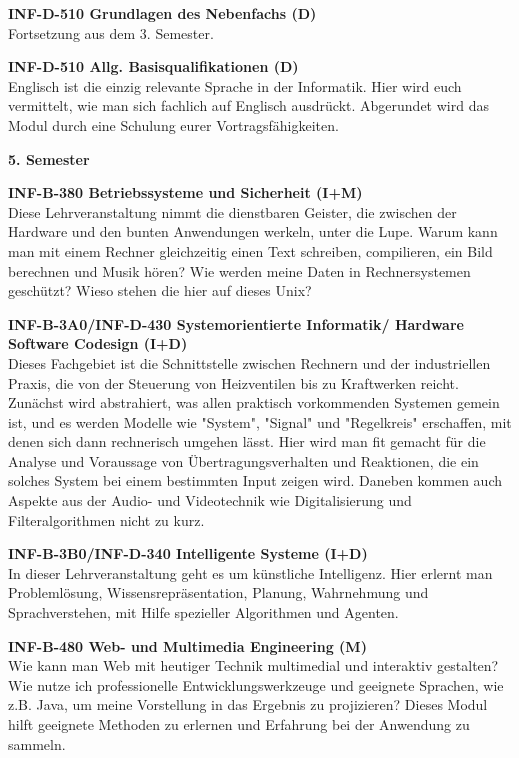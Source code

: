 \textbf{INF-D-510 Grundlagen des Nebenfachs (D)} \\
Fortsetzung aus dem 3. Semester.

\textbf{INF-D-510 Allg. Basisqualifikationen (D)} \\
Englisch ist die einzig relevante Sprache in der Informatik.
Hier wird euch vermittelt, wie man sich fachlich auf Englisch ausdrückt.
Abgerundet wird das Modul durch eine Schulung eurer Vortragsfähigkeiten.

\textbf{5. Semester}

\textbf{INF-B-380 Betriebssysteme und Sicherheit (I+M)} \\
Diese Lehrveranstaltung nimmt die dienstbaren Geister, die zwischen der Hardware und den bunten Anwendungen werkeln, unter die Lupe.
Warum kann man mit einem Rechner gleichzeitig einen Text schreiben, compilieren, ein Bild berechnen und Musik hören?
Wie werden meine Daten in Rechnersystemen geschützt?
Wieso stehen die hier auf dieses Unix?

\textbf{INF-B-3A0/INF-D-430 Systemorientierte Informatik/ Hardware Software Codesign (I+D)} \\
Dieses Fachgebiet ist die Schnittstelle zwischen Rechnern und der industriellen Praxis, die von der Steuerung von Heizventilen bis zu Kraftwerken reicht.
Zunächst wird abstrahiert, was allen praktisch vorkommenden Systemen gemein ist, und es werden Modelle wie "System", "Signal" und "Regelkreis" erschaffen, mit denen sich dann rechnerisch umgehen lässt.
Hier wird man fit gemacht für die Analyse und Voraussage von Übertragungsverhalten und Reaktionen, die ein solches System bei einem bestimmten Input zeigen wird.
Daneben kommen auch Aspekte aus der Audio- und Videotechnik wie Digitalisierung und Filteralgorithmen nicht zu kurz.

\textbf{INF-B-3B0/INF-D-340 Intelligente Systeme (I+D)} \\
In dieser Lehrveranstaltung geht es um künstliche Intelligenz.
Hier erlernt man Problemlösung, Wissensrepräsentation, Planung, Wahrnehmung und Sprachverstehen, mit Hilfe spezieller Algorithmen und Agenten.

\textbf{INF-B-480 Web- und Multimedia Engineering (M)} \\
Wie kann man Web mit heutiger Technik multimedial und interaktiv gestalten?
Wie nutze ich professionelle Entwicklungswerkzeuge und geeignete Sprachen, wie z.B. Java, um meine Vorstellung in das Ergebnis zu projizieren?
Dieses Modul hilft geeignete Methoden zu erlernen und Erfahrung bei der Anwendung zu sammeln.

